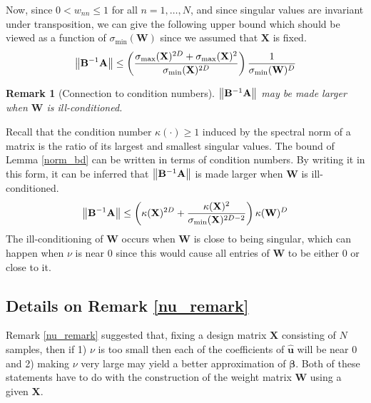 \documentclass[mnsc,blindrev]{informs3}
\newcommand{\bu}{\mathbf{u}}
\newcommand{\bA}{\mathbf{A}}
\newcommand{\bB}{\mathbf{B}}
\newcommand{\bX}{\mathbf{X}}
\newcommand{\bW}{\mathbf{W}}
\newtheorem{remark2}[thm]{Remark}
\begin{document}
    Now, since $0<w_{nn}\leq 1$ for all $n=1,\ldots,N$, and since singular values are invariant under transposition, we can give the following upper bound which should be viewed as a function of $\sigma_{\min}(\bW)$ since we assumed that $\bX$ is fixed. 
    \begin{equation*}
        \norm{\bB^{-1}\bA} \leq \left(\frac{\sigma_{\max}(\bX)^{2D} + \sigma_{\max}(\bX)^2}{\sigma_{\min}(\bX)^{2D}}\right) \frac{1}{\sigma_{\min}(\bW)^D}
    \end{equation*}

\begin{remark2}[Connection to condition numbers]
    \label{condition_number_remark}
    $\norm{\bB^{-1}\bA}$ may be made larger when $\bW$ is ill-conditioned.
\end{remark2}
        Recall that the condition number $\kappa(\cdot)\geq 1$ induced by the spectral norm of a matrix is the ratio of its largest and smallest singular values. The bound of Lemma \ref{norm_bd} can be written in terms of condition numbers. By writing it in this form, it can be inferred that $\norm{\bB^{-1}\bA}$ is made larger when $\bW$ is ill-conditioned. 
    \begin{equation*}
        \norm{\bB^{-1}\bA} \leq \left(\kappa(\bX)^{2D} + \frac{\kappa(\bX)^2}{\sigma_{\min}(\bX)^{2D-2}}\right) \kappa(\bW)^D 
    \end{equation*}
    The ill-conditioning of $\bW$ occurs when $\bW$ is close to being singular, which can happen when $\nu$ is near $0$ since this would cause all entries of $\bW$ to be either 0 or close to it. 


    \subsection{Details on Remark \ref{nu_remark}}
                Remark \ref{nu_remark} suggested that, fixing a design matrix $\bX$ consisting of $N$ samples, then if 1) $\nu$ is too small then each of the coefficients of $\hat{\bu}$ will be near $0$ and 2) making $\nu$ very large may yield a better  approximation of $\boldsymbol{\beta}$. Both of these statements have to do with the construction of the weight matrix $\bW$ using a given $\bX$. 
\end{document}
